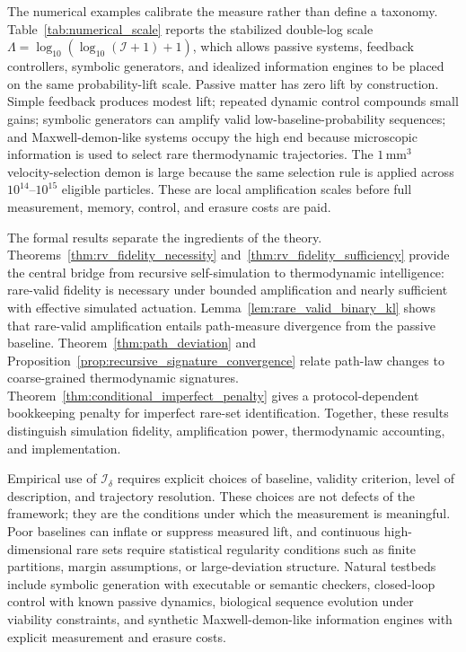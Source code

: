 \documentclass[
  aps,
  prresearch,
  reprint,
  amsmath,
  amssymb,
  superscriptaddress,
  nofootinbib,
  longbibliography
]{revtex4-2}
\newcommand{\calI}{\mathcal{I}}
\begin{document}
The numerical examples calibrate the measure rather than define a taxonomy. Table~\ref{tab:numerical_scale} reports the stabilized double-log scale \(\Lambda=\log_{10}(\log_{10}(\calI+1)+1)\), which allows passive systems, feedback controllers, symbolic generators, and idealized information engines to be placed on the same probability-lift scale. Passive matter has zero lift by construction. Simple feedback produces modest lift; repeated dynamic control compounds small gains; symbolic generators can amplify valid low-baseline-probability sequences; and Maxwell-demon-like systems occupy the high end because microscopic information is used to select rare thermodynamic trajectories. The \(1\,\mathrm{mm}^3\) velocity-selection demon is large because the same selection rule is applied across \(10^{14}\)--\(10^{15}\) eligible particles. These are local amplification scales before full measurement, memory, control, and erasure costs are paid.

The formal results separate the ingredients of the theory. Theorems~\ref{thm:rv_fidelity_necessity} and~\ref{thm:rv_fidelity_sufficiency} provide the central bridge from recursive self-simulation to thermodynamic intelligence: rare-valid fidelity is necessary under bounded amplification and nearly sufficient with effective simulated actuation. Lemma~\ref{lem:rare_valid_binary_kl} shows that rare-valid amplification entails path-measure divergence from the passive baseline. Theorem~\ref{thm:path_deviation} and Proposition~\ref{prop:recursive_signature_convergence} relate path-law changes to coarse-grained thermodynamic signatures. Theorem~\ref{thm:conditional_imperfect_penalty} gives a protocol-dependent bookkeeping penalty for imperfect rare-set identification. Together, these results distinguish simulation fidelity, amplification power, thermodynamic accounting, and implementation.

Empirical use of \(\calI_\delta\) requires explicit choices of baseline, validity criterion, level of description, and trajectory resolution. These choices are not defects of the framework; they are the conditions under which the measurement is meaningful. Poor baselines can inflate or suppress measured lift, and continuous high-dimensional rare sets require statistical regularity conditions such as finite partitions, margin assumptions, or large-deviation structure. Natural testbeds include symbolic generation with executable or semantic checkers, closed-loop control with known passive dynamics, biological sequence evolution under viability constraints, and synthetic Maxwell-demon-like information engines with explicit measurement and erasure costs.
\end{document}
